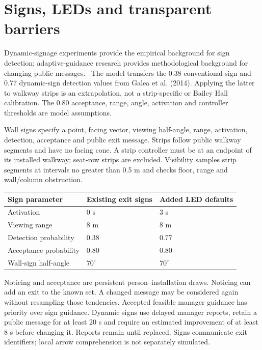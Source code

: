 \documentclass[11pt,a4paper]{article}
\begin{document}
\section{Signs, LEDs and transparent barriers}
Dynamic-signage experiments provide the empirical background for sign detection; adaptive-guidance research provides methodological background for changing public messages.~\cite{galea2014,galea2017,cellevac} The model transfers the 0.38 conventional-sign and 0.77 dynamic-sign detection values from Galea et al. (2014). Applying the latter to walkway strips is an extrapolation, not a strip-specific or Bailey Hall calibration. The 0.80 acceptance, range, angle, activation and controller thresholds are model assumptions.~\cite{model,implementation}

Wall signs specify a point, facing vector, viewing half-angle, range, activation, detection, acceptance and public exit message. Strips follow public walkway segments and have no facing cone. A strip controller must be at an endpoint of its installed walkway; seat-row strips are excluded. Visibility samples strip segments at intervals no greater than 0.5 m and checks floor, range and wall/column obstruction.

\begin{center}\small
\begin{tabularx}{\linewidth}{Xll}\toprule
Sign parameter & Existing exit signs & Added LED defaults\\\midrule
Activation & 0 s & 3 s\\
Viewing range & 8 m & 8 m\\
Detection probability & 0.38 & 0.77\\
Acceptance probability & 0.80 & 0.80\\
Wall-sign half-angle & $70^\circ$ & $70^\circ$\\\bottomrule
\end{tabularx}
\end{center}

Noticing and acceptance are persistent person--installation draws. Noticing can add an exit to the known set. A changed message may be considered again without resampling those tendencies. Accepted feasible manager guidance has priority over sign guidance. Dynamic signs use delayed manager reports, retain a public message for at least 20 s and require an estimated improvement of at least 8 s before changing it. Reports remain until replaced. Signs communicate exit identifiers; local arrow comprehension is not separately simulated.
\end{document}
